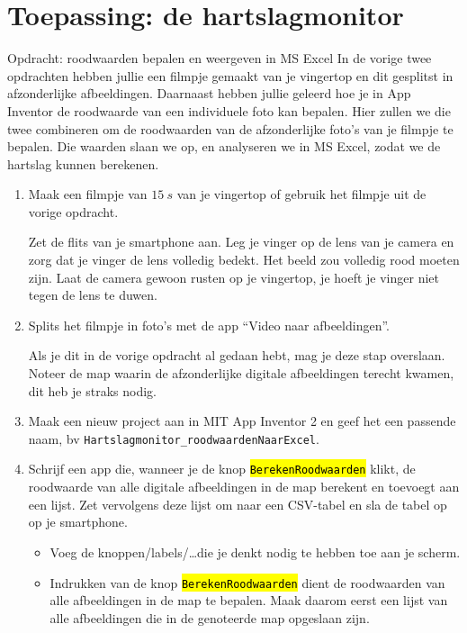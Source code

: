 \section{Toepassing: de hartslagmonitor}
\label{sec:Mod3_Sec3}
%

\begin{opdracht}{Opdracht: roodwaarden bepalen en weergeven in MS Excel}
	In de vorige twee opdrachten hebben jullie een filmpje gemaakt van je vingertop en dit gesplitst in afzonderlijke afbeeldingen. Daarnaast hebben jullie geleerd hoe je in App Inventor de roodwaarde van een individuele foto kan bepalen. Hier zullen we die twee combineren om de roodwaarden van de afzonderlijke foto's van je filmpje te bepalen. Die waarden slaan we op, en analyseren we in MS Excel, zodat we de hartslag kunnen berekenen.
	
\begin{enumerate}
	
	\item Maak een filmpje van $15~s$ van je vingertop of gebruik het filmpje uit de vorige opdracht.
	
	Zet de flits van je smartphone aan. Leg je vinger op de lens van je camera en zorg dat je vinger de lens volledig bedekt. Het beeld zou volledig rood moeten zijn. Laat de camera gewoon rusten op je vingertop, je hoeft je vinger niet tegen de lens te duwen.
	
	\item Splits het filmpje in foto's met de app \textquotedblleft Video naar afbeeldingen\textquotedblright.
	
	Als je dit in de vorige opdracht al gedaan hebt, mag je deze stap overslaan. Noteer de map waarin de afzonderlijke digitale afbeeldingen terecht kwamen, dit heb je straks nodig.
	
	\item Maak een nieuw project aan in MIT App Inventor 2 en geef het een passende naam, bv \texttt{Hartslagmonitor\_roodwaardenNaarExcel}. 
	
	\item Schrijf een app die, wanneer je de knop \hl{\texttt{BerekenRoodwaarden}} klikt, de roodwaarde van alle digitale afbeeldingen in de map berekent en toevoegt aan een lijst. Zet vervolgens deze lijst om naar een CSV-tabel en sla de tabel op op je smartphone.

	
		\begin{itemize}
			\item Voeg de knoppen/labels/\ldots die je denkt nodig te hebben toe aan je scherm.
			\item Indrukken van de knop \hl{\texttt{BerekenRoodwaarden}} dient de roodwaarden van alle afbeeldingen in de map te bepalen. Maak daarom eerst een lijst van alle afbeeldingen die in de genoteerde map opgeslaan zijn. 
			

\end{itemize}
\end{enumerate}
\end{opdracht}
